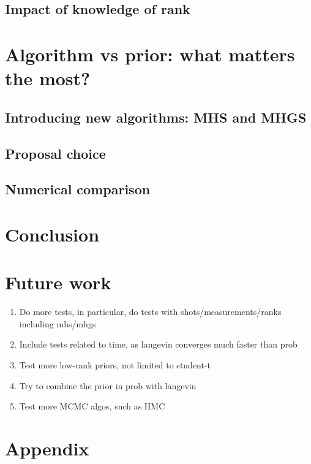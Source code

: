 \documentclass[12pt]{memoir}
\begin{document}
\section{Impact of knowledge of rank}

\chapter{Algorithm vs prior: what matters the most?}\label{section:algo-vs-prior}

\section{Introducing new algorithms: MHS and MHGS}

\section{Proposal choice}

\section{Numerical comparison}



\chapter{Conclusion}

\chapter{Future work}
\begin{enumerate}
    \item Do more tests, in particular, do tests with shots/measurements/ranks including mhs/mhgs
    \item Include tests related to time, as langevin converges much faster than prob
    \item Test more low-rank priors, not limited to student-t
    \item Try to combine the prior in prob with langevin
    \item Test more MCMC algos, such as HMC
\end{enumerate}

% 
% 
\printbibliography

\chapter*{Appendix}
\end{document}
